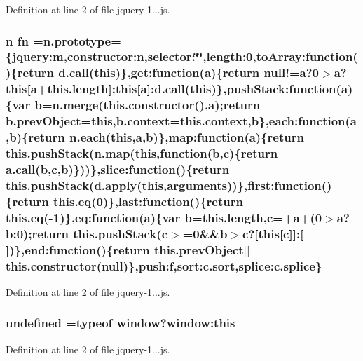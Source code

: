 Definition at line 2 of file jquery-\/1...\+js.

\hypertarget{jquery-1_811_80_8js_a4f0af84f62a6e2f4aee1d072192b48ec}{
\subsubsection[{fn}]{\setlength{\rightskip}{0pt plus 5cm}n fn =n.\+prototype=\{jquery\+:m,constructor\+:n,selector\+:\char`\"{}\char`\"{},length\+:0,to\+Array\+:function()\{return d.\+call(this)\},get\+:function({\bf a})\{return null!={\bf a}?0$>${\bf a}?this\mbox{[}{\bf a}+this.\+length\mbox{]}\+:this\mbox{[}{\bf a}\mbox{]}\+:d.\+call(this)\},push\+Stack\+:function({\bf a})\{var {\bf b}=n.\+merge(this.\+constructor(),{\bf a});return b.\+prev\+Object=this,{\bf b.\+context}={\bf this.\+context},{\bf b}\},each\+:function({\bf a},{\bf b})\{return {\bf n.\+each}(this,{\bf a},{\bf b})\},map\+:function({\bf a})\{return this.\+push\+Stack(n.\+map(this,function({\bf b},{\bf c})\{return a.\+call({\bf b},{\bf c},{\bf b})\}))\},slice\+:function()\{return this.\+push\+Stack(d.\+apply(this,arguments))\},first\+:function()\{return this.\+eq(0)\},last\+:function()\{return this.\+eq(-\/1)\},eq\+:function({\bf a})\{var {\bf b}=this.\+length,{\bf c}=+{\bf a}+(0$>${\bf a}?b\+:0);return this.\+push\+Stack({\bf c}$>$=0\&\&{\bf b}$>${\bf c}?\mbox{[}this\mbox{[}{\bf c}\mbox{]}\mbox{]}\+:\mbox{[}$\,$\mbox{]})\},end\+:function()\{return this.\+prev\+Object$\vert$$\vert$this.\+constructor(null)\},push\+:f,sort\+:c.\+sort,splice\+:c.\+splice\}}}\label{jquery-1_811_80_8js_a4f0af84f62a6e2f4aee1d072192b48ec}


Definition at line 2 of file jquery-\/1...\+js.

\hypertarget{jquery-1_811_80_8js_ae21cc36bf0d65014c717a481a3f8a468}{
\subsubsection[{undefined}]{\setlength{\rightskip}{0pt plus 5cm}undefined =typeof {\bf window}?window\+:this}}\label{jquery-1_811_80_8js_ae21cc36bf0d65014c717a481a3f8a468}


Definition at line 2 of file jquery-\/1...\+js.

